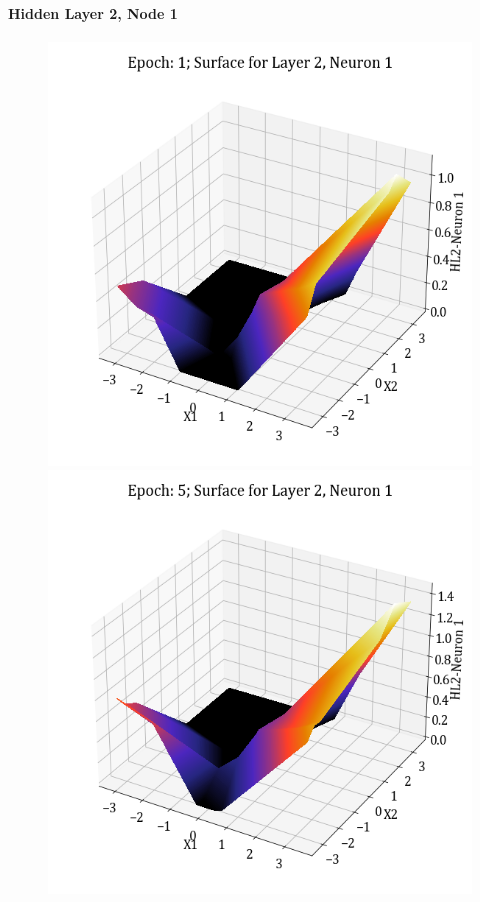 \documentclass[11pt,a4paper]{article}
\begin{document}
\paragraph{Hidden Layer 2, Node 1}
\begin{figure}[H]
    \centering
    \includegraphics[scale=0.4]{images/1B_MLFFNN_E1_HL2_N1.png}
    \includegraphics[scale=0.4]{images/1B_MLFFNN_E5_HL2_N1.png}

\end{figure}
\end{document}
